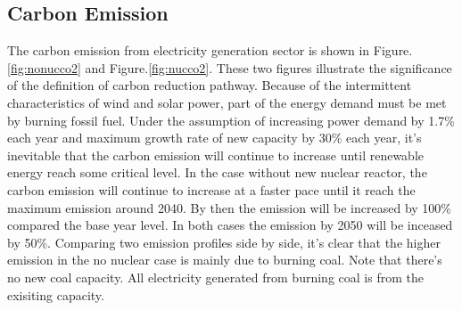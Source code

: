 \documentclass[14pt,a4paper]{article} %
\begin{document}
\subsection{Carbon Emission}
The carbon emission from electricity generation sector is shown in Figure.\ref{fig:nonucco2} and Figure.\ref{fig:nucco2}. These two figures illustrate the significance of the definition of carbon reduction pathway. Because of the intermittent characteristics of wind and solar power, part of the energy demand must be met by burning fossil fuel. Under the assumption of increasing power demand by 1.7\% each year and maximum growth rate of new capacity by 30\% each year, it's inevitable that the carbon emission will continue to increase until renewable energy reach some critical level. In the case without new nuclear reactor, the carbon emission will continue to increase at a faster pace until it reach the maximum emission around 2040. By then the emission will be increased by 100\% compared the base year level. In both cases the emission by 2050 will be inceased by 50\%. Comparing two emission profiles side by side, it's clear that the higher emission in the no nuclear case is mainly due to burning coal. Note that there's no new coal capacity. All electricity generated from burning coal is from the exisiting capacity.
\end{document}
